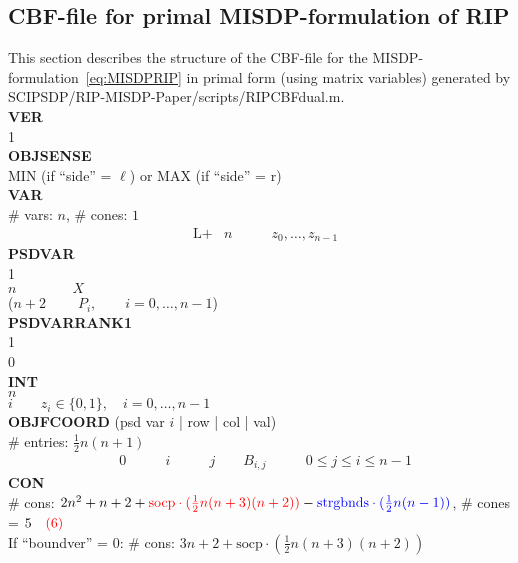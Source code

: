 \documentclass[11pt,a4paper]{article}
\theoremstyle{definition}
\begin{document}
\subsection{CBF-file for primal MISDP-formulation of RIP}
\label{sec:CBFprimal}
This section describes the structure of the CBF-file for the
MISDP-formulation~\eqref{eq:MISDPRIP} in primal form (using matrix variables)
generated by
\textsf{SCIPSDP/RIP-MISDP-Paper/scripts/RIPCBFdual.m}.\\

{\footnotesize
\noindent
\textbf{VER} \\
1 \\
\textbf{OBJSENSE} \\
MIN (if ``side'' = $\ell$) \; or \; MAX (if ``side'' = r) \\
\textbf{VAR} \\
\# vars:  $n$, \qquad \# cones: $1$ \\
\[
  \begin{aligned}
    &\text{L+} &n \qquad & z_0,\dots,z_{n-1}
  \end{aligned}
\]
\textbf{PSDVAR} \\
1  \\
$n \qquad \qquad X$ \\
{\color{red} ($n+2 \qquad \; P_i, \qquad i = 0,\dots,n-1$)}\\
{\color{green}\textbf{PSDVARRANK1}  \\
1 \\
0\\}
\textbf{INT} \\
$n$ \\
$i \qquad z_i \in \{0,1\}, \quad i = 0,\dots,n-1$ \\
\textbf{OBJFCOORD} (psd var $i$ | row | col | val) \\
\# entries: $\tfrac{1}{2}n(n+1)$\\
\[
  \begin{aligned}
    &0 \qquad &i \qquad &j \qquad B_{i,j} \qquad & 0\leq j \leq i \leq n-1
  \end{aligned}
\]
\textbf{CON} \\
\# cons: $2n^2+n+2 + {\color{red}\text{socp}\cdot(\tfrac{1}{2}n(n+3)(n+2))} - {\color{blue}
    \text{strgbnds} \cdot (\tfrac{1}{2}n(n-1))}$, \qquad
\# cones = $5 \quad {\color{red} (6)}$\\
{\color{violet} If ``boundver'' = 0: \# cons: $3n+2 +
  \text{socp}\cdot(\tfrac{1}{2}n(n+3)(n+2))$} \\
\[
  \begin{aligned}

\end{aligned}\]}
\end{document}
